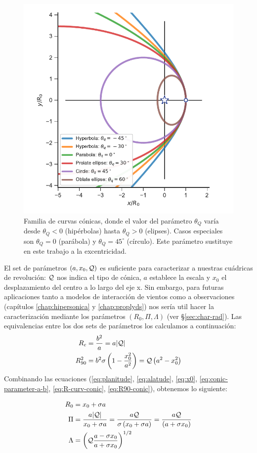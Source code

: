 \begin{figure}
  \includegraphics[width = 0.5\linewidth]{./Figures/conic1}
  \caption{Familia de curvas cónicas, donde el valor del parámetro $\theta_Q$ varía desde $\theta_Q < 0$ (hipérbolas) hasta $\theta_Q > 0$ (elipses). Casos especiales son $\theta_Q = 0$ (parábola) y $\theta_Q = 45^\circ$ (círculo). Este parámetro sustituye en este trabajo a la excentricidad.}
  \label{fig:conics-family}
\end{figure}
El set de parámetros $(a, x_0, \mathcal{Q})$ es suficiente para caracterizar a nuestras cuádricas de revolución: $\mathcal{Q}$ nos indica el tipo de cónica, $a$ establece la escala y $x_0$ el desplazamiento del centro a lo largo del eje x. Sin embargo, para futuras aplicaciones tanto a modelos de interacción de vientos como a observaciones (capítulos \ref{chap:hipersonica} y \ref{chap:proplyds}) nos sería util hacer la caracterización mediante los parámetros $(R_0, \Pi, \Lambda)$ (ver \S \ref{sec:char-rad}). Las equivalencias entre los dos sets de parámetros los calculamos a continuación:
\begin{align} 
  R_c &= \frac{b^2}{a} = a|\mathcal{Q}|\label{eq:R-curv-conic}\\
  R^2_{90} &= b^2\sigma\left(1 - \frac{x^2_0}{a^2}\right) = \mathcal{Q}\left(a^2 - x^2_0\right)\label{eq:R90-conic} 
\end{align}
Combinando las ecuaciones (\ref{eq:planitude}, \ref{eq:alatude}, \ref{eq:x0}, \ref{eq:conic-parameter-a-b}, \ref{eq:R-curv-conic}, \ref{eq:R90-conic}), obtenemos lo siguiente:

\begin{align}
  R_0 &= x_0 + \sigma a \label{eq:R0}\\
  \Pi &= \frac{a|\mathcal{Q}|}{x_0 + \sigma a} = \frac{a\mathcal{Q}}{\sigma\left(x_0 + \sigma a\right)} = \frac{a\mathcal{Q}}{\left(a + \sigma x_0\right)}\label{eq:quadric-planitude}\\
  \Lambda &= \left(\mathcal{Q}\frac{a-\sigma x_0}{a + \sigma x_0}\right)^{1/2}
\end{align}

